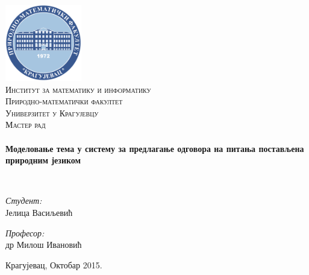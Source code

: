 %
%

\begin{titlepage}

\begin{center}

\includegraphics[width=0.25\textwidth]{logo-pmf.pdf}\\[1cm]    

\textsc{\LARGE Институт за математику и информатику
\\ Природно-математички факултет
\\ Универзитет у Крагујевцу}\\[1.5cm]

\textsc{\Large Мастер рад}\\[0.5cm]

\HRule \\[0.4cm]
{ \LARGE \bfseries Моделовање тема у систему за предлагање одговора на питања постављена природним језиком}

\HRule \\[2.5cm]

\begin{minipage}{0.4\textwidth}
\begin{flushleft} \large
\emph{Студент:}\\
Јелица Васиљевић
\end{flushleft}
\end{minipage}
\begin{minipage}{0.4\textwidth}
\begin{flushright} \large
\emph{Професор:} \\
др Милош Ивановић
\end{flushright}
\end{minipage}

\vfill

{\large Крагујевац, Октобар 2015.}

\end{center}

\end{titlepage}
